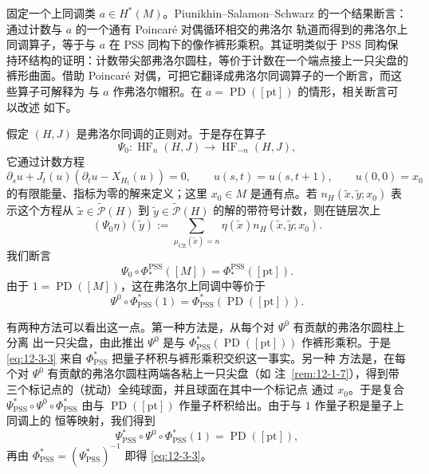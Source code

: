 \begin{remark}[\BookRecordIndex{T0245}帽积]\label{rem:12-3-3}
固定一个上同调类 $a\in H^*(M)$。Piunikhin--Salamon--Schwarz
 的一个结果断言：通过计数与 $a$ 的一个通有 Poincaré 对偶循环相交的弗洛尔
轨道而得到的弗洛尔上同调算子，等于与 $a$ 在 PSS 同构下的像作裤形乘积。其证明类似于
PSS 同构保持环结构的证明：计数带尖部弗洛尔圆柱，等价于计数在一个端点接上一只尖盘的
裤形曲面。借助 Poincaré 对偶，可把它翻译成弗洛尔同调算子的一个断言，而这些算子可解释为
与 $a$ 作弗洛尔帽积。在 $a=\operatorname{PD}([\mathrm{pt}])$ 的情形，相关断言可以改述
如下。

假定 $(H,J)$ 是弗洛尔同调的正则对。于是存在算子
\[
  \Psi_0:\operatorname{HF}_n(H,J)\longrightarrow
  \operatorname{HF}_{-n}(H,J),
\]
它通过计数方程
\[
  \partial_su+J_t(u)(\partial_tu-X_{H_t}(u))=0,
  \qquad u(s,t)=u(s,t+1),
  \qquad u(0,0)=x_0
\]
的有限能量、指标为零的解来定义；这里 $x_0\in M$ 是通有点。若
$n_H(\widetilde x,\widetilde y;x_0)$ 表示这个方程从
$\widetilde x\in\widetilde{\mathcal P}(H)$ 到
$\widetilde y\in\widetilde{\mathcal P}(H)$ 的解的带符号计数，则在链层次上
\[
  (\Psi_0\eta)(\widetilde y)
  :=\sum_{\mu_{\mathrm{CZ}}(\widetilde x)=n}
  \eta(\widetilde x)n_H(\widetilde x,\widetilde y;x_0).
\]
我们断言
\begin{equation}\label{eq:12-3-2}
  \Psi_0\circ\Phi_*^{\mathrm{PSS}}([M])
  =\Phi_*^{\mathrm{PSS}}([\mathrm{pt}]).
\end{equation}
由于 $1=\operatorname{PD}([M])$，这在弗洛尔上同调中等价于
\begin{equation}\label{eq:12-3-3}
  \Psi^0\circ\Phi^*_{\mathrm{PSS}}(1)
  =\Phi^*_{\mathrm{PSS}}(\operatorname{PD}([\mathrm{pt}])).
\end{equation}

有两种方法可以看出这一点。第一种方法是，从每个对 $\Psi^0$ 有贡献的弗洛尔圆柱上分离
出一只尖盘，由此推出 $\Psi^0$ 是与
$\Phi^*_{\mathrm{PSS}}(\operatorname{PD}([\mathrm{pt}]))$ 作裤形乘积。于是
\eqref{eq:12-3-3} 来自 $\Phi^*_{\mathrm{PSS}}$ 把量子杯积与裤形乘积交织这一事实。另一种
方法是，在每个对 $\Psi^0$ 有贡献的弗洛尔圆柱两端各粘上一只尖盘（如
注~\ref{rem:12-1-7}），得到带三个标记点的（扰动）全纯球面，并且球面在其中一个标记点
通过 $x_0$。于是复合
$\Psi^*_{\mathrm{PSS}}\circ\Psi^0\circ\Phi^*_{\mathrm{PSS}}$ 由与
$\operatorname{PD}([\mathrm{pt}])$ 作量子杯积给出。由于与 $1$ 作量子积是量子上同调上的
恒等映射，我们得到
\[
  \Psi^*_{\mathrm{PSS}}\circ\Psi^0\circ\Phi^*_{\mathrm{PSS}}(1)
  =\operatorname{PD}([\mathrm{pt}]),
\]
再由 $\Phi^*_{\mathrm{PSS}}=(\Psi^*_{\mathrm{PSS}})^{-1}$ 即得
\eqref{eq:12-3-3}。
\end{remark}
